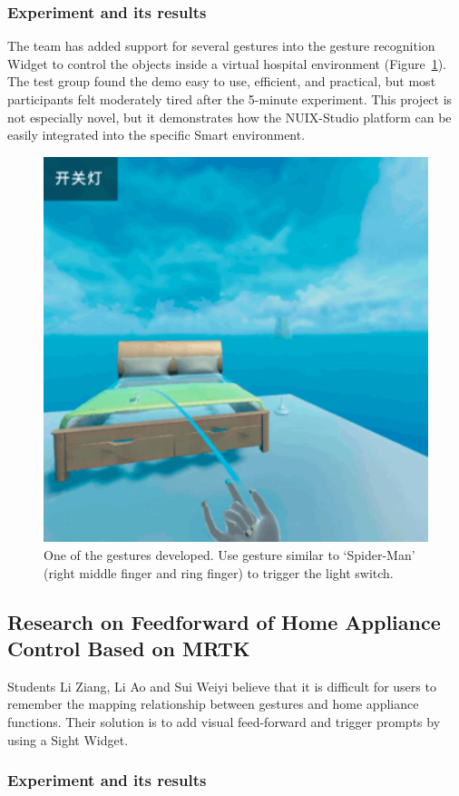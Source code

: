 \subsubsection{Experiment and its results}

The team has added support for several gestures into the gesture recognition Widget to control the objects inside a virtual hospital environment (Figure~\ref{fig:Project4-figure}). The test group found the demo easy to use, efficient, and practical, but most participants felt moderately tired after the 5-minute experiment. This project is not especially novel, but it demonstrates how the NUIX-Studio platform can be easily integrated into the specific Smart environment.

\begin{figure}
  \centering
  \includegraphics[width=0.6\linewidth]{figures/Project_4.png}
  \caption{One of the gestures developed. Use gesture similar to ‘Spider-Man’ (right middle finger and ring finger) to trigger the light switch.}
  \label{fig:Project4-figure}
\end{figure}

\subsection{Research on Feedforward of Home Appliance Control Based on MRTK}

Students Li Ziang, Li Ao and Sui Weiyi believe that it is difficult for users to remember the mapping relationship between gestures and home appliance functions. Their solution is to add visual feed-forward and trigger prompts by using a Sight Widget.

\subsubsection{Experiment and its results}

